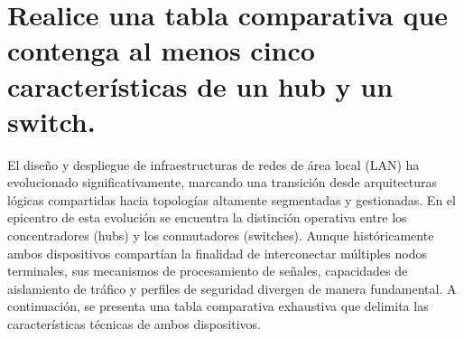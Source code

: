 \documentclass[a4paper,12pt]{article}
\begin{document}
\setcounter{page}{1}

\tableofcontents


\newpage

\section{Realice una tabla comparativa que contenga al menos cinco características de un hub y un switch.}

El diseño y despliegue de infraestructuras de redes de área local (LAN) ha evolucionado significativamente, marcando una transición desde arquitecturas lógicas compartidas hacia topologías altamente segmentadas y gestionadas. En el epicentro de esta evolución se encuentra la distinción operativa entre los concentradores (hubs) y los conmutadores (switches). Aunque históricamente ambos dispositivos compartían la finalidad de interconectar múltiples nodos terminales, sus mecanismos de procesamiento de señales, capacidades de aislamiento de tráfico y perfiles de seguridad divergen de manera fundamental. A continuación, se presenta una tabla comparativa exhaustiva que delimita las características técnicas de ambos dispositivos.
\end{document}
